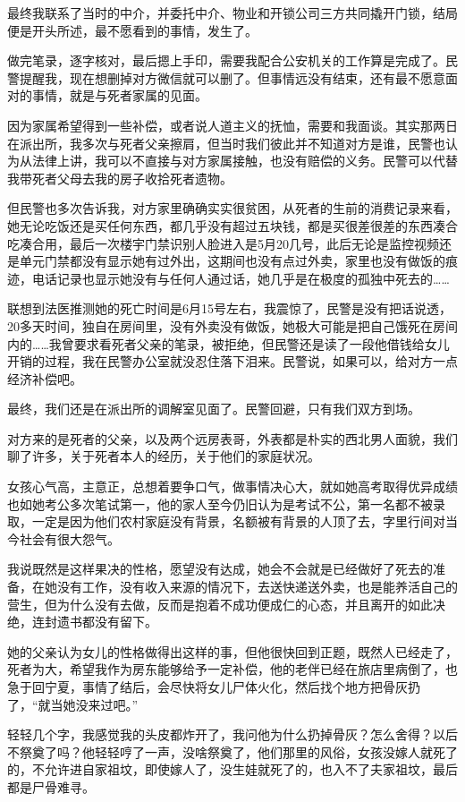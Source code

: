 最终我联系了当时的中介，并委托中介、物业和开锁公司三方共同撬开门锁，结局便是开头所述，最不愿看到的事情，发生了。

做完笔录，逐字核对，最后摁上手印，需要我配合公安机关的工作算是完成了。民警提醒我，现在想删掉对方微信就可以删了。但事情远没有结束，还有最不愿意面对的事情，就是与死者家属的见面。

因为家属希望得到一些补偿，或者说人道主义的抚恤，需要和我面谈。其实那两日在派出所，我多次与死者父亲擦肩，但当时我们彼此并不知道对方是谁，民警也认为从法律上讲，我可以不直接与对方家属接触，也没有赔偿的义务。民警可以代替我带死者父母去我的房子收拾死者遗物。

但民警也多次告诉我，对方家里确确实实很贫困，从死者的生前的消费记录来看，她无论吃饭还是买任何东西，都几乎没有超过五块钱，都是买很差很差的东西凑合吃凑合用，最后一次楼宇门禁识别人脸进入是5月20几号，此后无论是监控视频还是单元门禁都没有显示她有过外出，这期间也没有点过外卖，家里也没有做饭的痕迹，电话记录也显示她没有与任何人通过话，她几乎是在极度的孤独中死去的……

联想到法医推测她的死亡时间是6月15号左右，我震惊了，民警是没有把话说透，20多天时间，独自在房间里，没有外卖没有做饭，她极大可能是把自己饿死在房间内的……我曾要求看死者父亲的笔录，被拒绝，但民警还是读了一段他借钱给女儿开销的过程，我在民警办公室就没忍住落下泪来。民警说，如果可以，给对方一点经济补偿吧。

最终，我们还是在派出所的调解室见面了。民警回避，只有我们双方到场。

对方来的是死者的父亲，以及两个远房表哥，外表都是朴实的西北男人面貌，我们聊了许多，关于死者本人的经历，关于他们的家庭状况。

女孩心气高，主意正，总想着要争口气，做事情决心大，就如她高考取得优异成绩也如她考公多次笔试第一，他的家人至今仍旧认为是考试不公，第一名都不被录取，一定是因为他们农村家庭没有背景，名额被有背景的人顶了去，字里行间对当今社会有很大怨气。

我说既然是这样果决的性格，愿望没有达成，她会不会就是已经做好了死去的准备，在她没有工作，没有收入来源的情况下，去送快递送外卖，也是能养活自己的营生，但为什么没有去做，反而是抱着不成功便成仁的心态，并且离开的如此决绝，连封遗书都没有留下。

她的父亲认为女儿的性格做得出这样的事，但他很快回到正题，既然人已经走了，死者为大，希望我作为房东能够给予一定补偿，他的老伴已经在旅店里病倒了，也急于回宁夏，事情了结后，会尽快将女儿尸体火化，然后找个地方把骨灰扔了，“就当她没来过吧。”

轻轻几个字，我感觉我的头皮都炸开了，我问他为什么扔掉骨灰？怎么舍得？以后不祭奠了吗？他轻轻哼了一声，没啥祭奠了，他们那里的风俗，女孩没嫁人就死了的，不允许进自家祖坟，即使嫁人了，没生娃就死了的，也入不了夫家祖坟，最后都是尸骨难寻。


